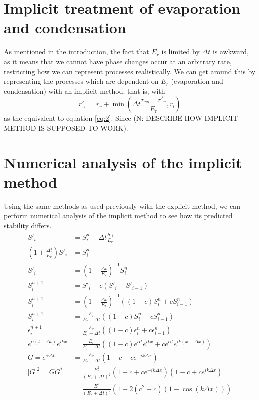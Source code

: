 \documentclass[11pt]{article}
\begin{document}
\section{Implicit treatment of evaporation and condensation}
As mentioned in the introduction, the fact that $E_r$ is limited by $\Delta t$ is awkward, as it means that we cannot have phase changes occur at an arbitrary rate, restricting how we can represent processes realistically. We can get around this by representing the processes which are dependent on $E_r$ (evaporation and condensation) with an implicit method: that is, with
\[
r'_v = r_v + \min\left(\Delta t\frac{r_{vs} - r'_v}{E_r},r_l\right)
\]
as the equivalent to equation \ref{eq:2}. Since (N: DESCRIBE HOW IMPLICIT METHOD IS SUPPOSED TO WORK).

\section{Numerical analysis of the implicit method}
Using the same methods as used previously with the explicit method, we can perform numerical analysis of the implicit method to see how its predicted stability differs.
\begin{align*}
S'_i &= S^n_i - \Delta t\frac{S'_i}{E_r}				\\
\left(1+\frac{\Delta t}{E_r}\right)S'_i &= S^n_i		\\
S'_i &= \left(1+\frac{\Delta t}{E_r}\right)^{-1}S^n_i	\\
S^{n+1}_i &= S'_i - c\left(S'_i - S'_{i-1}\right)			\\
S^{n+1}_i &= \left(1+\frac{\Delta t}{E_r}\right)^{-1}\left(\left(1-c\right)S^n_i + cS^n_{i-1}\right)	\\
S^{n+1}_i &= \frac{E_r}{E_r+\Delta t}\left(\left(1-c\right)S^n_i + cS^n_{i-1}\right)				\\
\epsilon^{n+1}_i &= \frac{E_r}{E_r+\Delta t}\left(\left(1-c\right)\epsilon^n_i + c\epsilon^n_{i-1}\right)	\\
e^{\alpha\left(t+\Delta t\right)}e^{ikx} &= \frac{E_r}{E_r+\Delta t}\left(\left(1-c\right)e^{\alpha t}e^{ikx} + ce^{\alpha t}e^{ik\left(x-\Delta x\right)}\right)		\\
G = e^{\alpha\Delta t} &= \frac{E_r}{E_r+\Delta t}\left(1 - c + ce^{-ik\Delta x}\right)	\\
|G|^2 = G G^* &= \frac{E_r^2}{\left(E_r+\Delta t\right)^2}\left(1 - c + ce^{-ik\Delta x}\right)\left(1 - c + ce^{ik\Delta x}\right)	\\
&= \frac{E_r^2}{\left(E_r+\Delta t\right)^2}\left(1 + 2(c^2-c)\left(1 - \cos\left(k\Delta x\right)\right)\right)
\end{align*}
\end{document}
